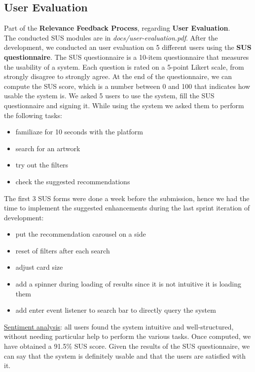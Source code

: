 \documentclass[12pt]{spieman}  %
\begin{document}
\begin{spacing}{1}
    \subsection{User Evaluation}
    Part of the \textbf{Relevance Feedback Process}, regarding \textbf{User Evaluation}.\\
    The conducted SUS modules are in \textit{docs/user-evaluation.pdf}.
    After the development, we conducted an user evaluation on 5 different users
    using the \textbf{SUS questionnaire}.
    The SUS questionnaire is a 10-item questionnaire that measures the usability of a system.
    Each question is rated on a 5-point Likert scale, from strongly disagree to strongly agree.
    At the end of the questionnaire, we can compute the SUS score, which is a number
    between 0 and 100 that indicates how usable the system is.
    We asked 5 users to use the system, fill the SUS questionnaire and signing it.
    While using the system we asked them to perform the following tasks:
    \begin{itemize}
        \setlength\itemsep{0.1em}
        \item familiaze for 10 seconds with the platform
        \item search for an artwork
        \item try out the filters
        \item check the suggested recommendations
    \end{itemize}
    The first 3 SUS forms were done a week before the submission, hence we had the time to
    implement the suggested enhancements during the last sprint iteration of development:
    \begin{itemize}
        \setlength\itemsep{0.1em}
        \item put the recommendation carousel on a side
        \item reset of filters after each search
        \item adjust card size
        \item add a spinner during loading of results since it is not intuitive it is loading them
        \item add enter event listener to search bar to directly query the system
    \end{itemize}

    \underline{Sentiment analysis}: all users found the system intuitive and well-structured,
    without needing particular help to perform the various tasks.
    Once computed, we have obtained a 91.5\% SUS score.
    Given the results of the SUS questionnaire, we can say that the system is definitely usable
    and that the users are satisfied with it.


\end{spacing}
\end{document}
